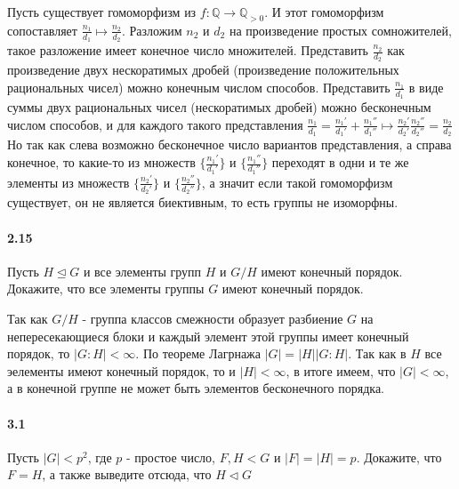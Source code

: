 \documentclass[a4paper,12pt]{article}
\begin{document}
\begin{Solution}
Пусть существует гомоморфизм из $f:\mathbb{Q} \rightarrow \mathbb{Q}_{>0}$. И этот гомоморфизм сопоставляет $\frac{n_1}{d_1} \mapsto \frac{n_2}{d_2}$. Разложим $n_2$ и $d_2$ на произведение простых сомножителей, такое разложение имеет конечное число множителей. Представить $\frac{n_2}{d_2}$ как произведение двух нескоратимых дробей (произведение положительных рациональных чисел) можно конечным числом способов. Представить $\frac{n_1}{d_1}$ в виде суммы двух рациональных чисел (нескоратимых дробей) можно бесконечным числом способов, и для каждого такого представления $\frac{n_1}{d_1} = \frac{n_1'}{d_1'} + \frac{n_1''}{d_1''} \mapsto \frac{n_2'}{d_2'} \frac{n_2''}{d_2''} = \frac{n_2}{d_2}$ Но так как слева возможно бесконечное число вариантов представления, а справа конечное, то какие-то из множеств $\{\frac{n_1'}{d_1'}\}$ и $\{\frac{n_1''}{d_1''}\}$ переходят в одни и те же элементы из множеств $\{\frac{n_2'}{d_2'}\}$ и $\{\frac{n_2''}{d_2''}\}$, а значит если такой гомоморфизм существует, он не является биективным, то есть группы не изоморфны.
\end{Solution}

\paragraph{2.15} Пусть $H \trianglelefteq G$ и все элементы групп $H$ и $G/H$ имеют конечный порядок. Докажите, что все элементы группы $G$ имеют конечный порядок.

\begin{Solution}
Так как $G/H$ - группа классов смежности образует разбиение $G$ на непересекающиеся блоки и каждый элемент этой группы имеет конечный порядок, то $\left|G : H\right| < \infty$. По теореме Лагрнажа $\left|G\right| = \left|H\right| \left|G : H\right|$. Так как в $H$ все эелементы имеют конечный порядок, то и $\left|H\right| < \infty$, в итоге имеем, что $\left|G\right| < \infty$, а в конечной группе не может быть элементов бесконечного порядка.
\end{Solution}

\paragraph{3.1} Пусть $|G| < p^2$, где $p$ - простое число, $F,H < G$ и $|F| = |H| = p$. Докажите, что $F = H$, а также выведите отсюда, что $H \vartriangleleft G$
\end{document}

